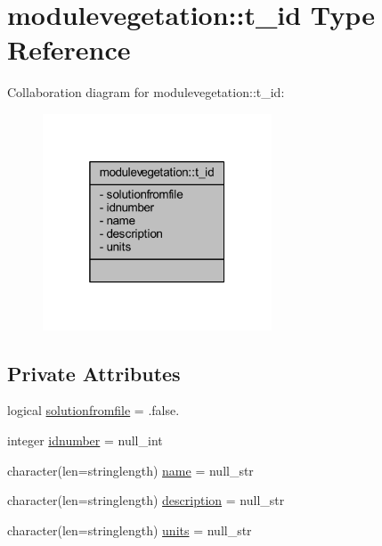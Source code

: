 \hypertarget{structmodulevegetation_1_1t__id}{}\section{modulevegetation\+:\+:t\+\_\+id Type Reference}
\label{structmodulevegetation_1_1t__id}


Collaboration diagram for modulevegetation\+:\+:t\+\_\+id\+:\nopagebreak
\begin{figure}[H]
\begin{center}
\leavevmode
\includegraphics[width=193pt]{structmodulevegetation_1_1t__id__coll__graph}
\end{center}
\end{figure}
\subsection*{Private Attributes}
\begin{DoxyCompactItemize}
\item 
logical \mbox{\hyperlink{structmodulevegetation_1_1t__id_a9405a0f7276ed500c7d3c4d8bd4e4935}{solutionfromfile}} = .false.
\item 
integer \mbox{\hyperlink{structmodulevegetation_1_1t__id_a2a6a4b880cb466983a1124a54c39902a}{idnumber}} = null\+\_\+int
\item 
character(len=stringlength) \mbox{\hyperlink{structmodulevegetation_1_1t__id_a738aee8eda825268c73442915d562a93}{name}} = null\+\_\+str
\item 
character(len=stringlength) \mbox{\hyperlink{structmodulevegetation_1_1t__id_ae7783559f4dee7f4181fae2c998dba60}{description}} = null\+\_\+str
\item 
character(len=stringlength) \mbox{\hyperlink{structmodulevegetation_1_1t__id_a3d2ee5611e1df630b451295fb201a560}{units}} = null\+\_\+str
\end{DoxyCompactItemize}


